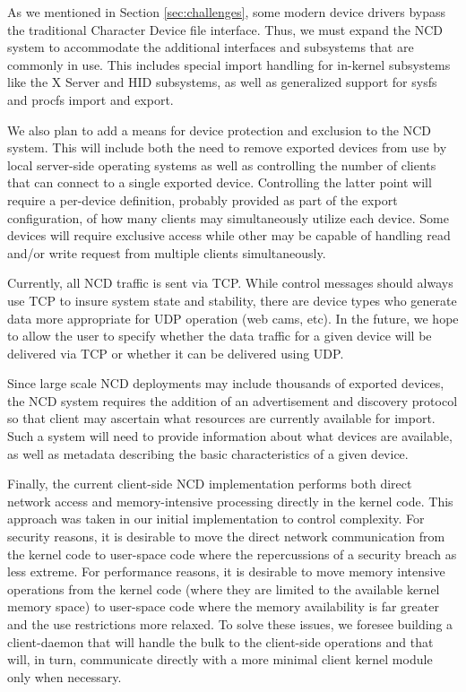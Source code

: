 \documentclass[11pt,twocolumn]{article}
\begin{document}
As we mentioned in Section \ref{sec:challenges}, some modern device
drivers bypass the traditional Character Device file interface. Thus, we
must expand the NCD system to accommodate the additional interfaces and
subsystems that are commonly in use. This includes special import
handling for in-kernel subsystems like the X Server and HID
subsystems, as well as generalized support for sysfs and procfs import
and export.

We also plan to add a means for device protection and exclusion to
the NCD system. This will include both the need to remove exported
devices from use by local server-side operating systems as well as controlling
the number of clients that can connect to a single exported
device. Controlling the latter point will require a per-device
definition, probably provided as part of the export configuration, of
how many clients may simultaneously utilize each device. Some devices will
require exclusive access while other may be capable of handling read
and/or write request from multiple clients simultaneously. 

Currently, all NCD traffic is sent via TCP. While control messages
should always use TCP to insure system state and stability, there are
device types who generate data more appropriate for UDP operation (web
cams, etc). In the future, we hope to allow the user to specify
whether the data traffic for a given device will be delivered via TCP
or whether it can be delivered using UDP.

Since large scale NCD deployments may include thousands of exported
devices, the NCD system requires the addition of an advertisement and
discovery protocol so that client may ascertain what resources are
currently available for import. Such a system will need to provide
information about what devices are available, as well as metadata
describing the basic characteristics of a given device.

Finally, the current client-side NCD implementation performs both direct
network access and memory-intensive processing directly in the kernel
code. This approach was taken in our initial implementation to control
complexity.
For security reasons, it is desirable to move the direct
network communication from the kernel code to user-space code where
the repercussions of a security breach as less extreme.
For performance reasons, it is desirable to move memory
intensive operations from the kernel code (where they are limited to
the available kernel memory space) to user-space code where the memory
availability is far greater and the use restrictions more relaxed. To
solve these issues, we
foresee building a client-daemon that will handle the bulk to the
client-side operations and that will, in turn, communicate directly with
a more minimal client kernel module only when necessary. 
\end{document}
